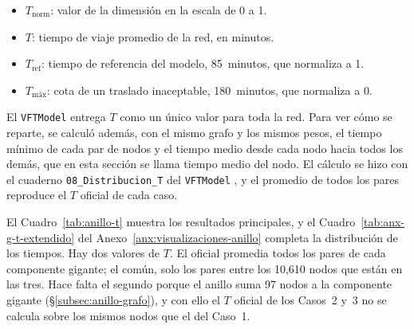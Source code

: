 \begin{itemize}
    \item $T_{\text{norm}}$: valor de la dimensión en la escala de 0 a 1.
    \item $T$: tiempo de viaje promedio de la red, en minutos.
    \item $T_{\text{ref}}$: tiempo de referencia del modelo, 85~minutos, que
          normaliza a 1.
    \item $T_{\text{máx}}$: cota de un traslado inaceptable, 180~minutos, que
          normaliza a 0.
\end{itemize}

El \texttt{VFTModel} entrega $T$ como un único valor para toda la red. Para ver
cómo se reparte, se calculó además, con el mismo grafo y los mismos pesos, el
tiempo mínimo de cada par de nodos y el tiempo medio desde cada nodo hacia
todos los demás, que en esta sección se llama tiempo medio del nodo. El cálculo
se hizo con el cuaderno \texttt{08\_Distribucion\_T} del \texttt{VFTModel}
\citep{cabrera2026VFTModel}, y el promedio de todos los pares reproduce el $T$
oficial de cada caso.

El Cuadro~\ref{tab:anillo-t} muestra los resultados principales, y el
Cuadro~\ref{tab:anx-g-t-extendido} del Anexo~\ref{anx:visualizaciones-anillo}
completa la distribución de los tiempos. Hay dos valores de $T$. El oficial
promedia todos los pares de cada componente gigante; el común, solo los pares
entre los 10,610 nodos que están en las tres. Hace falta el segundo porque el
anillo suma 97 nodos a la componente gigante (§\ref{subsec:anillo-grafo}), y
con ello el $T$ oficial de los Casos~2 y~3 no se calcula sobre los mismos nodos
que el del Caso~1.

